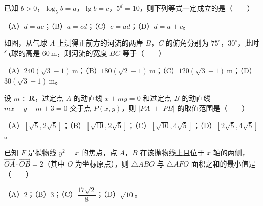 \begin{question}
已知 $b>0$，$\log_5 b=a$，$\lg b=c$，$5^d=10$，则下列等式一定成立的是\mbox{（　　）}

（A）$d=ac$；（B）$a=cd$；（C）$c=ad$；（D）$d=a+c$。

\Needspace{0.4\textheight}
\end{question}
\begin{question}
如图，从气球 $A$ 上测得正前方的河流的两岸 $B$，$C$ 的俯角分别为 $75^\circ$，$30^\circ$，此时气球的高是 $60\ \mathrm m$，则河流的宽度 $BC$ 等于\mbox{（　　）}

（A）$240(\sqrt3-1)\ \mathrm m$；（B）$180(\sqrt2-1)\ \mathrm m$；（C）$120(\sqrt3-1)\ \mathrm m$；（D）$30(\sqrt3+1)\ \mathrm m$。
\nopagebreak[4]
\begin{center}\end{center}
\nopagebreak[4]
\end{question}
\begin{question}
设 $m\in\mathbf R$，过定点 $A$ 的动直线 $x+my=0$ 和过定点 $B$ 的动直线 $mx-y-m+3=0$ 交于点 $P(x,y)$，则 $|PA|+|PB|$ 的取值范围是\mbox{（　　）}

（A）$[\sqrt5,2\sqrt5]$；（B）$[\sqrt{10},2\sqrt5]$；（C）$[\sqrt{10},4\sqrt5]$；（D）$[2\sqrt5,4\sqrt5]$。

\end{question}
\begin{question}
已知 $F$ 是抛物线 $y^2=x$ 的焦点，点 $A$，$B$ 在该抛物线上且位于 $x$ 轴的两侧，$\overrightarrow{OA}\cdot\overrightarrow{OB}=2$（其中 $O$ 为坐标原点），则 $\triangle ABO$ 与 $\triangle AFO$ 面积之和的最小值是\mbox{（　　）}

（A）$2$；（B）$3$；（C）$\dfrac{17\sqrt2}8$；（D）$\sqrt{10}$。

\end{question}

